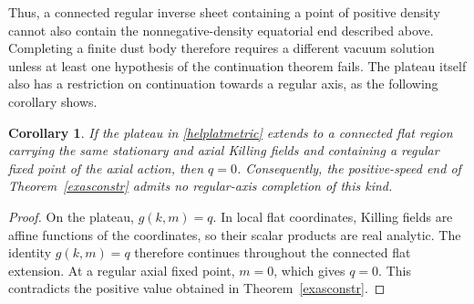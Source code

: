 \documentclass[amsmath,amsfonts,amssymb,aps,pra,superscriptaddress,10pt]{revtex4-2}
\numberwithin{equation}{section}
\theoremstyle{plain}
\newtheorem{corollary}{Corollary}
\theoremstyle{definition}
\theoremstyle{remark}
\theoremstyle{definition}
\begin{document}
Thus, a connected regular inverse sheet containing a point of positive density cannot also contain the nonnegative-density equatorial end described above. Completing a finite dust body therefore requires a different vacuum solution unless at least one hypothesis of the continuation theorem fails. The plateau itself also has a restriction on continuation towards a regular axis, as the following corollary shows.

\begin{corollary}
If the plateau in \eqref{helplatmetric} extends to a connected flat region carrying the same stationary and axial Killing fields and containing a regular fixed point of the axial action, then $q=0$. Consequently, the positive-speed end of Theorem~\ref{exasconstr} admits no regular-axis completion of this kind.
\end{corollary}

\begin{proof}
On the plateau, $g(k,m)=q$. In local flat coordinates, Killing fields are affine functions of the coordinates, so their scalar products are real analytic. The identity $g(k,m)=q$ therefore continues throughout the connected flat extension. At a regular axial fixed point, $m=0$, which gives $q=0$. This contradicts the positive value obtained in Theorem~\ref{exasconstr}.
\end{proof}
\end{document}
